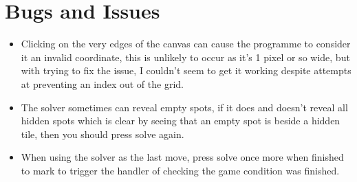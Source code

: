 \documentclass{article} %
\begin{document}
\section{Bugs and Issues}
\begin{itemize}
    \item Clicking on the very edges of the canvas can cause the programme to consider it an invalid coordinate, this is unlikely to occur as it's 1 pixel or so
          wide, but with trying to fix the issue, I couldn't seem to get it working despite attempts at preventing an index out of the grid.
    \item The solver sometimes can reveal empty spots, if it does and doesn't reveal all hidden spots which is clear by seeing that an empty spot is beside a hidden
          tile, then you should press solve again.
    \item When using the solver as the last move, press solve once more when finished to mark to trigger the handler of checking the game condition was finished.
\end{itemize}
\end{document}
